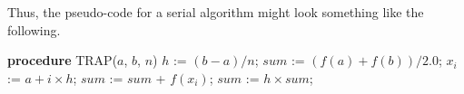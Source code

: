 \documentclass[12pt]{article}
\begin{document}
Thus, the pseudo-code for a serial algorithm might look something like the following.
\begin{algorithm}[!h]
\begin{algorithmic}[1]
	\STATE \textbf{procedure} TRAP($a$, $b$, $n$)
    \STATE $h$ := $(b - a)/n$;
    \STATE $sum$ := $(f(a) + f(b))/2.0$;
        \STATE $x_i$ := $a + i \times h$;
        \STATE $sum$ := $sum$ + $f(x_i)$;
    \ENDFOR
    \STATE $sum$ := $h \times sum$;
\end{algorithmic}
\end{algorithm}
\end{document}
